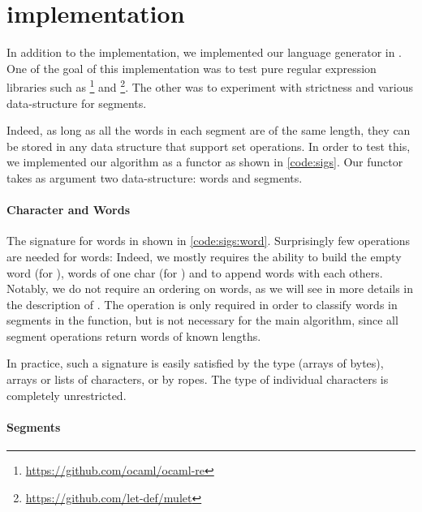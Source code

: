 \section{\ocaml implementation}
\label{sec:ocaml}

\lstset{language=[Objective]Caml}

In addition to the \haskell implementation, we implemented our language generator
in \ocaml. One of the goal of this implementation was to test
pure \ocaml regular expression libraries such as \footnote{\url{https://github.com/ocaml/ocaml-re}} and
\footnote{\url{https://github.com/let-def/mulet}}. 
The other was to experiment with strictness and various data-structure for
segments.

Indeed, as long as all the words in each segment are of the same length,
they can be stored in any data structure that support set operations.
In order to test this, we implemented our algorithm as a functor as shown in \autoref{code:sigs}.
Our functor takes as argument two data-structure: words and segments.

\paragraph{Character and Words}

The signature for words in shown in \autoref{code:sigs:word}.
Surprisingly few operations are needed for words: Indeed, we mostly requires the ability to build the empty word (for ),
words of one char (for ) and to append words
with each others. Notably, we do not require an ordering on words, as we will
see in more details in the description of .
The  operation is only required in order to classify
words in segments in the  function, but is not necessary for the
main algorithm, since all segment operations return words of known lengths.

In practice, such a signature is easily satisfied by the \ocaml {}
type (\ie arrays of bytes), arrays or lists of characters, or by ropes. The
type of individual characters is completely unrestricted.

\paragraph{Segments}



